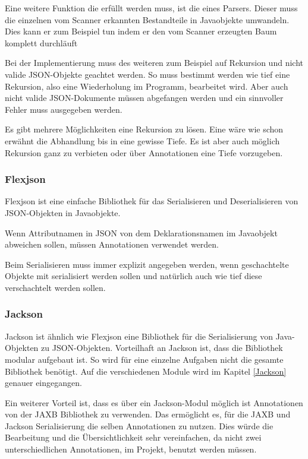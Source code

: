 Eine weitere Funktion die erf\"ullt werden muss, ist die eines Parsers. Dieser muss die einzelnen vom Scanner erkannten Bestandteile in Javaobjekte umwandeln. Dies kann er zum Beispiel tun indem er den vom Scanner erzeugten Baum komplett durchl\"auft 

Bei der Implementierung muss des weiteren zum Beispiel auf Rekursion und nicht valide \ac{JSON}-Objekte geachtet werden. So muss bestimmt werden wie tief eine Rekursion, also eine Wiederholung im Programm, bearbeitet wird. Aber auch nicht valide JSON-Dokumente m\"ussen abgefangen werden und ein sinnvoller Fehler muss ausgegeben werden.

Es gibt mehrere M\"oglichkeiten eine Rekursion zu l\"osen. Eine w\"are wie schon erw\"ahnt die Abhandlung bis in eine gewisse Tiefe. Es ist aber auch m\"oglich Rekursion ganz zu verbieten oder \"uber Annotationen eine Tiefe vorzugeben.

\subsubsection{Flexjson}
Flexjson ist eine einfache Bibliothek f\"ur das Serialisieren und Deserialisieren von \ac{JSON}-Objekten in Javaobjekte.\cite{FlexJSON}

Wenn Attributnamen in \ac{JSON} von dem Deklarationsnamen im Javaobjekt abweichen sollen, m\"ussen Annotationen verwendet werden.

Beim Serialisieren muss immer explizit angegeben werden, wenn geschachtelte Objekte mit serialisiert werden sollen und nat\"urlich auch wie tief diese verschachtelt werden sollen.

\subsubsection{Jackson}
Jackson ist \"ahnlich wie Flexjson eine Bibliothek f\"ur die Serialisierung von Java-Objekten zu \ac{JSON}-Objekten. Vorteilhaft an Jackson ist, dass die Bibliothek modular aufgebaut ist. So wird f\"ur eine einzelne Aufgaben nicht die gesamte Bibliothek ben\"otigt. Auf die verschiedenen Module wird im Kapitel \ref{Jackson} genauer eingegangen.
\cite{Jackson}

Ein weiterer Vorteil ist, dass es \"uber ein Jackson-Modul m\"oglich ist Annotationen von der \ac{JAXB} Bibliothek zu verwenden. Das
erm\"oglicht es, f\"ur die \ac{JAXB} und Jackson Serialisierung die selben Annotationen zu nutzen. Dies w\"urde die Bearbeitung und die \"Ubersichtlichkeit sehr vereinfachen, da nicht zwei unterschiedlichen Annotationen, im Projekt, benutzt werden m\"ussen.


